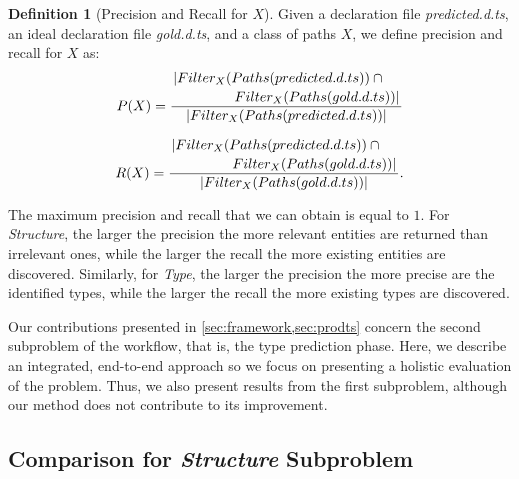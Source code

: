 \documentclass[sigplan,10pt,review,anonymous]{acmart} %
\theoremstyle{plain}
\theoremstyle{remark}
\theoremstyle{definition}
\newtheorem{defn}{Definition}[section]
\begin{document}
\begin{defn}[Precision and Recall for $X$] \label{def:precision_recall}
	Given a declaration file \textit{predicted.d.ts},
	an ideal declaration file \textit{gold.d.ts}, and a class of paths $X$,
	we define precision and recall for $X$ as:
	\begin{equation}
		P(X) =
		\dfrac{\splitdfrac{|Filter_X(Paths(predicted.d.ts)) \cap {}}{Filter_X(Paths(gold.d.ts)) |}}{|Filter_X(Paths(predicted.d.ts)) |}
	\end{equation}

	\begin{equation}
		R(X) =
		\dfrac{\splitdfrac{|Filter_X(Paths(predicted.d.ts)) \cap {}} {Filter_X(Paths(gold.d.ts)) |}}
		{|Filter_X(Paths(gold.d.ts))|}.
	\end{equation}
\end{defn}
%
The maximum precision and recall that we can obtain is equal to $1$.
%
For \textit{Structure}, the larger the precision the more relevant entities are returned than irrelevant ones,
while the larger the recall the more existing entities are discovered.
%
Similarly, for \textit{Type}, the larger the precision the more precise are the identified types,
while the larger the recall the more existing types are discovered.

Our contributions presented in \cref{sec:framework,sec:prodts} concern the second subproblem of the workflow,
that is, the type prediction phase.
%
Here, we describe an integrated, end-to-end approach so we focus on presenting a holistic evaluation of the problem.
%
Thus, we also present results from the first subproblem,
although our method does not contribute to its improvement.
%

\subsection{Comparison for \textit{Structure} Subproblem}\label{ssec:structure_comparison}
\end{document}
